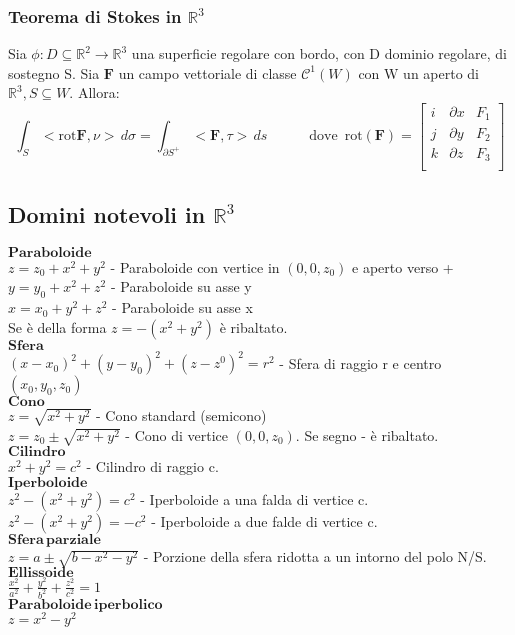 \documentclass{article} %
\begin{document}
    \subsubsection*{Teorema di Stokes in $\mathbb{R}^3$}
    Sia $\phi:D \subseteq \mathbb{R}^2 \to \mathbb{R}^3$ una superficie regolare con bordo, con D dominio regolare, di sostegno S. Sia $\mathbf{F}$ un campo vettoriale di classe $\mathcal{C}^1(W)$ con W un aperto di $\mathbb{R}^3, S \subseteq W$. Allora:
    $$\int_S < \text{rot} \mathbf{F}, \nu> \, d \sigma = \int_{\partial S^+} < \mathbf{F} , \tau > \, ds \,\,\,\,\,\,\,\,\,\,\,\,\,\,\,\,\,\, \text{dove} \,\,\, \text{rot}(\mathbf{F}) = \begin{bmatrix}
        i & \partial x & F_1\\
        j & \partial y & F_2 \\
        k & \partial z & F_3 \\
    \end{bmatrix}$$

    \subsection{Domini notevoli in $\mathbb{R}^3$}
    $\mathbf{Paraboloide}$ \\
    $z = z_0 + x^2 + y^2$ - Paraboloide con vertice in $(0,0,z_0)$ e aperto verso + \\
    $y = y_0 + x^2 + z^2$ - Paraboloide su asse y \\
    $x = x_0 + y^2 + z^2$ - Paraboloide su asse x \\
    Se è della forma $z=-(x^2 + y^2)$ è ribaltato. \\
    $\mathbf{Sfera}$ \\
    $(x-x_0)^2+(y-y_0)^2+(z-z^0)^2=r^2$ - Sfera di raggio r e centro $(x_0,y_0,z_0)$ \\
    $\mathbf{Cono}$ \\
    $z = \sqrt{x^2+y^2}$ - Cono standard (semicono)\\
    $z = z_0 \pm \sqrt{x^2+y^2}$ - Cono di vertice $(0,0,z_0)$. Se segno - è ribaltato. \\
    $\mathbf{Cilindro}$ \\
    $x^2+y^2=c^2$ - Cilindro di raggio c. \\
    $\mathbf{Iperboloide}$ \\
    $z^2-(x^2+y^2)=c^2$ - Iperboloide a una falda di vertice c. \\
    $z^2-(x^2+y^2)= - c^2$ - Iperboloide a due falde di vertice c. \\
    $\mathbf{Sfera \, parziale}$ \\
    $z= a \pm \sqrt{b-x^2-y^2}$ - Porzione della sfera ridotta a un intorno del polo N/S. \\
    $\mathbf{Ellissoide}$ \\
    $\frac{x^2}{a^2}+\frac{y^2}{b^2}+\frac{z^2}{c^2}=1$ \\
    $\mathbf{Paraboloide \, iperbolico}$ \\
    $z = x^2 - y^2$ \\
\end{document}

